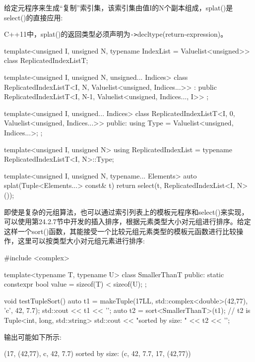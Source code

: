 给定元程序来生成“复制”索引集，该索引集由值I的N个副本组成，splat()是select()的直接应用:

\begin{notice}
C++11中，splat()的返回类型必须声明为\texttt{->}decltype(return-expression)。
\end{notice}

\begin{cpp}
template<unsigned I, unsigned N, typename IndexList = Valuelist<unsigned>>
class ReplicatedIndexListT;

template<unsigned I, unsigned N, unsigned... Indices>
class ReplicatedIndexListT<I, N, Valuelist<unsigned, Indices...>>
: public ReplicatedIndexListT<I, N-1,
								Valuelist<unsigned, Indices..., I>> {
};

template<unsigned I, unsigned... Indices>
class ReplicatedIndexListT<I, 0, Valuelist<unsigned, Indices...>> {
	public:
	using Type = Valuelist<unsigned, Indices...>;
};

template<unsigned I, unsigned N>
using ReplicatedIndexList = typename ReplicatedIndexListT<I, N>::Type;

template<unsigned I, unsigned N, typename... Elements>
auto splat(Tuple<Elements...> const& t)
{
	return select(t, ReplicatedIndexList<I, N>());
}
\end{cpp}

即使是复杂的元组算法，也可以通过索引列表上的模板元程序和select()来实现，可以使用第24.2.7节中开发的插入排序，根据元素类型大小对元组进行排序。给定这样一个sort()函数，其能接受一个比较元组元素类型的模板元函数进行比较操作，这里可以按类型大小对元组元素进行排序:

\begin{cpp}
#include <complex>

template<typename T, typename U>
class SmallerThanT
{
	public:
	static constexpr bool value = sizeof(T) < sizeof(U);
};

void testTupleSort()
{
	auto t1 = makeTuple(17LL, std::complex<double>(42,77), ’c’, 42, 7.7);
	std::cout << t1 << ’\n’;
	auto t2 = sort<SmallerThanT>(t1); // t2 is Tuple<int, long, std::string>
	std::cout << "sorted by size: " << t2 << ’\n’;
}
\end{cpp}

输出可能如下所示:

\begin{cpp}
(17, (42,77), c, 42, 7.7)
sorted by size: (c, 42, 7.7, 17, (42,77))
\end{cpp}

